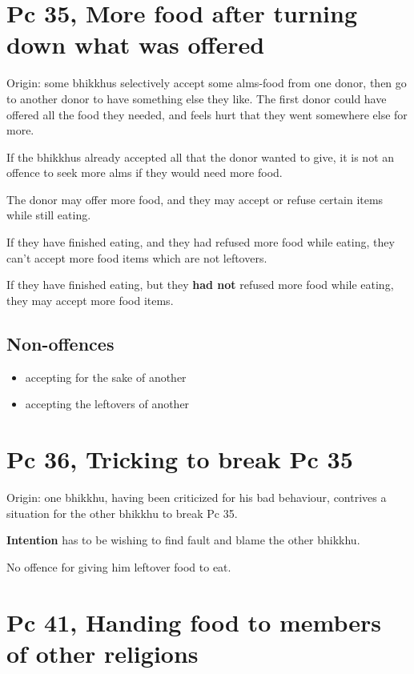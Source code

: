 \section{Pc 35, More food after turning down what was offered}

Origin: some bhikkhus selectively accept some alms-food from one donor,
then go to another donor to have something else they like. The first
donor could have offered all the food they needed, and feels hurt that
they went somewhere else for more.

If the bhikkhus already accepted all that the donor wanted to give, it
is not an offence to seek more alms if they would need more food.

The donor may offer more food, and they may accept or refuse certain
items while still eating.

If they have finished eating, and they had refused more food while
eating, they can't accept more food items which are not leftovers.

If they have finished eating, but they \textbf{had not} refused more
food while eating, they may accept more food items.

\subsection{Non-offences}

\begin{itemize}
\tightlist
\item
  accepting for the sake of another
\item
  accepting the leftovers of another
\end{itemize}

\section{Pc 36, Tricking to break Pc 35}

Origin: one bhikkhu, having been criticized for his bad behaviour,
contrives a situation for the other bhikkhu to break Pc 35.

\textbf{Intention} has to be wishing to find fault and blame the other
bhikkhu.

No offence for giving him leftover food to eat.

\section{Pc 41, Handing food to members of other religions}

